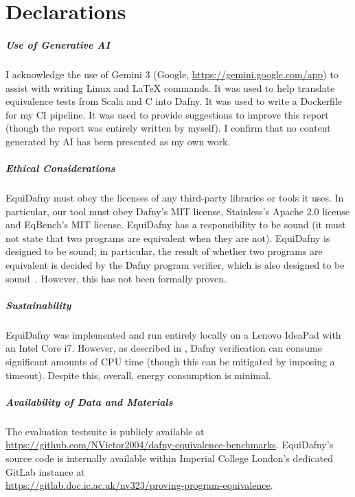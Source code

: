 \chapter*{Declarations}

\paragraph{Use of Generative AI} I acknowledge the use of Gemini 3 (Google, \url{https://gemini.google.com/app}) to assist with writing Linux and LaTeX commands. It was used to help translate equivalence tests from Scala and C into Dafny. It was used to write a Dockerfile for my CI pipeline. It was used to provide suggestions to improve this report (though the report was entirely written by myself). I confirm that no content generated by AI has been presented as my own work.  

\paragraph{Ethical Considerations} EquiDafny must obey the licenses of any third-party libraries or tools it uses. In particular, our tool must obey Dafny's MIT license, Stainless's Apache 2.0 license\cite{StainlessFrontendsBenchmarks} and EqBench's MIT license\cite{badihiEqBenchDatasetEquivalent2021}. EquiDafny has a responsibility to be sound (it must not state that two programs are equivalent when they are not). EquiDafny is designed to be sound; in particular, the result of whether two programs are equivalent is decided by the Dafny program verifier, which is also designed to be sound~\parencite{FAQ}. However, this has not been formally proven.

\paragraph{Sustainability} EquiDafny was implemented and run entirely locally on a Lenovo IdeaPad with an Intel Core i7. However, as described in , Dafny verification can consume significant amounts of CPU time (though this can be mitigated by imposing a timeout). Despite this, overall, energy consumption is minimal. 

\paragraph{Availability of Data and Materials}

The evaluation testsuite is publicly available at \url{https://github.com/NVictor2004/dafny-equivalence-benchmarks}. EquiDafny's source code is internally available within Imperial College London's dedicated GitLab instance at \\\url{https://gitlab.doc.ic.ac.uk/nv323/proving-program-equivalence}. 
